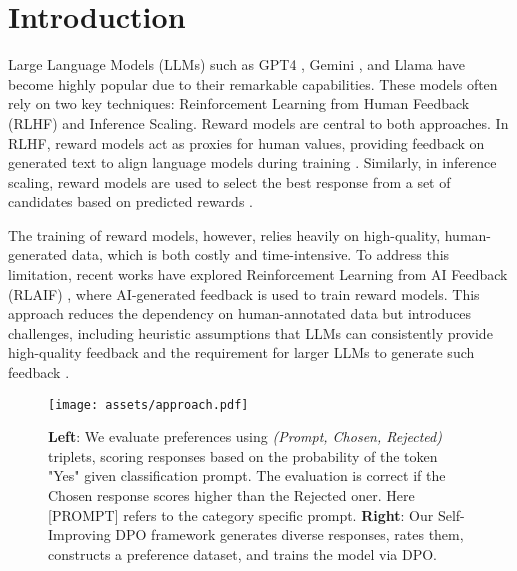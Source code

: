 \section{Introduction}

Large Language Models (LLMs) such as GPT4 \citep{openai2024gpt4technicalreport}, Gemini \citep{geminiteam2024gemini15unlockingmultimodal}, and Llama \citep{touvron2023llama2openfoundation} have become highly popular due to their remarkable capabilities. These models often rely on two key techniques: Reinforcement Learning from Human Feedback (RLHF) and Inference Scaling. Reward models are central to both approaches. In RLHF, reward models act as proxies for human values, providing feedback on generated text to align language models during training \cite{christiano2023deepreinforcementlearninghuman,ziegler2020finetuninglanguagemodelshuman}. Similarly, in inference scaling, reward models are used to select the best response from a set of candidates based on predicted rewards \cite{snell2024scalingllmtesttimecompute}.

The training of reward models, however, relies heavily on high-quality, human-generated data, which is both costly and time-intensive. To address this limitation, recent works have explored Reinforcement Learning from AI Feedback (RLAIF) \citep{lee2023rlaif}, where AI-generated feedback is used to train reward models. This approach reduces the dependency on human-annotated data but introduces challenges, including heuristic assumptions that LLMs can consistently provide high-quality feedback and the requirement for larger LLMs to generate such feedback \citep{pang2023language}.

\begin{figure*}[h!]
    \centering
 \texttt{[image: assets/approach.pdf]}
 \caption{\textbf{Left}: We evaluate preferences using \textit{(Prompt, Chosen, Rejected)} triplets, scoring responses based on the probability of the token "Yes" given classification prompt. The evaluation is correct if the Chosen response scores higher than the Rejected oner. Here [PROMPT] refers to the category specific prompt. \textbf{Right}: Our Self-Improving DPO framework generates diverse responses, rates them, constructs a preference dataset, and trains the model via DPO.}
    \label{Approach}
\end{figure*}

